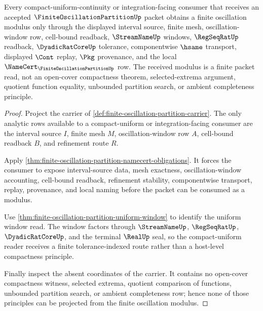 \begin{theorem}
\label{thm:compact-uniform-finite-oscillation-modulus}
Every compact-uniform-continuity or integration-facing consumer that receives an accepted $\FiniteOscillationPartitionUp$ packet obtains a finite oscillation modulus only through the displayed interval source, finite mesh, oscillation-window row, cell-bound readback, $\StreamNameUp$ windows, $\RegSeqRatUp$ readback, $\DyadicRatCoreUp$ tolerance, componentwise $\hsame$ transport, displayed $\Cont$ replay, $\Pkg$ provenance, and the local $\NameCert_{\FiniteOscillationPartitionUp}$ row. The received modulus is a finite packet read, not an open-cover compactness theorem, selected-extrema argument, quotient function equality, unbounded partition search, or ambient completeness principle.
\end{theorem}
\begin{proof}
Project the carrier of \autoref{def:finite-oscillation-partition-carrier}. The only analytic rows available to a compact-uniform or integration-facing consumer are the interval source $I$, finite mesh $M$, oscillation-window row $A$, cell-bound readback $B$, and refinement route $R$.

Apply \autoref{thm:finite-oscillation-partition-namecert-obligations}. It forces the consumer to expose interval-source data, mesh exactness, oscillation-window accounting, cell-bound readback, refinement stability, componentwise transport, replay, provenance, and local naming before the packet can be consumed as a modulus.

Use \autoref{thm:finite-oscillation-partition-uniform-window} to identify the uniform window read. The window factors through $\StreamNameUp$, $\RegSeqRatUp$, $\DyadicRatCoreUp$, and the terminal $\RealUp$ seal, so the compact-uniform reader receives a finite tolerance-indexed route rather than a host-level compactness principle.

Finally inspect the absent coordinates of the carrier. It contains no open-cover compactness witness, selected extrema, quotient comparison of functions, unbounded partition search, or ambient completeness row; hence none of those principles can be projected from the finite oscillation modulus.
\end{proof}

